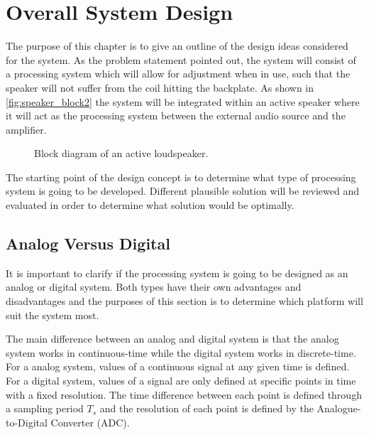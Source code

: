 \chapter{Overall System Design}
The purpose of this chapter is to give an outline of the design ideas considered for the system. As the problem statement pointed out, the system will consist of a processing system which will allow for adjustment when in use, such that the speaker will not suffer from the coil hitting the backplate. As shown in \autoref{fig:speaker_block2} the system will be integrated within an active speaker where it will act as the processing system between the external audio source and the amplifier.

\begin{figure}[H]
	\centering
	\scalebox{0.9}{
		}
	\caption{Block diagram of an active loudspeaker.}
	\label{fig:speaker_block2}
\end{figure}



The starting point of the design concept is to determine what type of processing system is going to be developed. Different plausible solution will be reviewed and evaluated in order to determine what solution would be optimally. 


\section{Analog Versus Digital}
It is important to clarify if the processing system is going to be designed as an analog or digital system. Both types have their own advantages and disadvantages and the purposes of this section is to determine which platform will suit the system most. 

The main difference between an analog and digital system is that the analog system works in continuous-time while the digital system works in discrete-time. For a analog system, values of a continuous signal at any given time is defined. For a digital system, values of a signal are only defined at specific points in time with a fixed resolution. The time difference between each point is defined through a sampling period $T_s$ and the resolution of each point is defined by the Analogue-to-Digital Converter (ADC).

